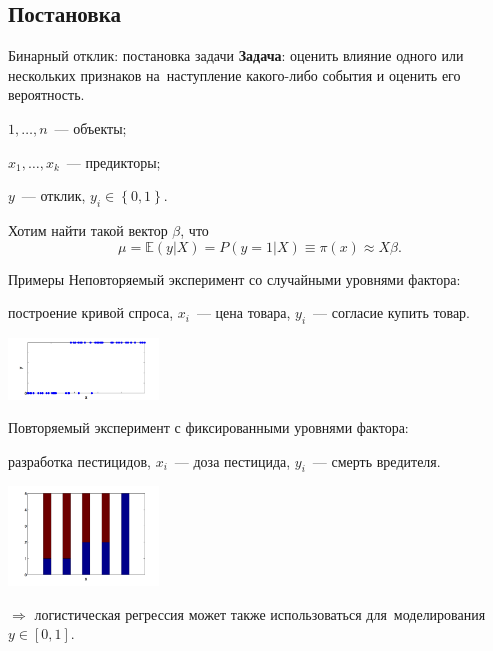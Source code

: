 \documentclass[9pt,pdf,utf8,hyperref={unicode},aspectratio=169]{beamer}
\begin{document}
\subsection{Постановка}
\begin{frame}{Бинарный отклик: постановка задачи}
    \textbf{Задача}: оценить влияние одного или нескольких признаков на~наступление какого-либо события и оценить его вероятность.

    \bigskip

    $1,\dots,n$~--- объекты;

    $x_1,\dots,x_k$~--- предикторы;

    $y$~--- отклик, $y_i \in \left\{0,1\right\}$.

	\bigskip  
	
	Хотим найти такой вектор $\beta$, что $$\mu = \mathbb{E} \left(y\left|X\right.\right) = P\left(y=1\left|X\right.\right) \equiv \pi(x) \approx X\beta.$$
\end{frame}

\begin{frame}{Примеры}
    Неповторяемый эксперимент со случайными уровнями фактора:
    
    построение кривой спроса, $x_i$~--- цена  товара, $y_i$~--- согласие купить товар. 
    \begin{center}
        \includegraphics[width=0.3\textwidth]{ex2.png}
    \end{center}

	\bigskip

    Повторяемый эксперимент с фиксированными уровнями фактора:
    
    разработка пестицидов, $x_i$~--- доза пестицида, $y_i$~--- смерть вредителя.    
    
    \begin{center}
        \includegraphics[width=0.3\textwidth]{ex1.png}
    \end{center}
    
    \vspace{-10pt}
    
    $\Longrightarrow$ логистическая регрессия может также использоваться для~моделирования $y \in \left[0,1\right].$    
\end{frame}
\end{document}

